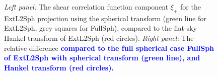 \documentclass[fleqn,usenatbib]{mnras} %
\newcommand{\mk}[1]{{\bf\textcolor{blue}{#1}}}
\begin{document}
\begin{figure}

  \begin{center}
  \end{center}

  \caption{\emph{Left panel:} The shear correlation function component $\xi_+$
for the ExtL2Sph projection using the spherical transform (green line for ExtL2Sph, grey squares for FullSph),
compared to the flat-sky Hankel transform of ExtL2Sph (red circles).
\emph{Right panel:} The relative
difference \mk{compared to the full spherical case FullSph of ExtL2Sph with spherical transform
(green line), 
and Hankel transform (red circles).}}

  \label{fig:xi_p_legendre}

\end{figure}
\end{document}
